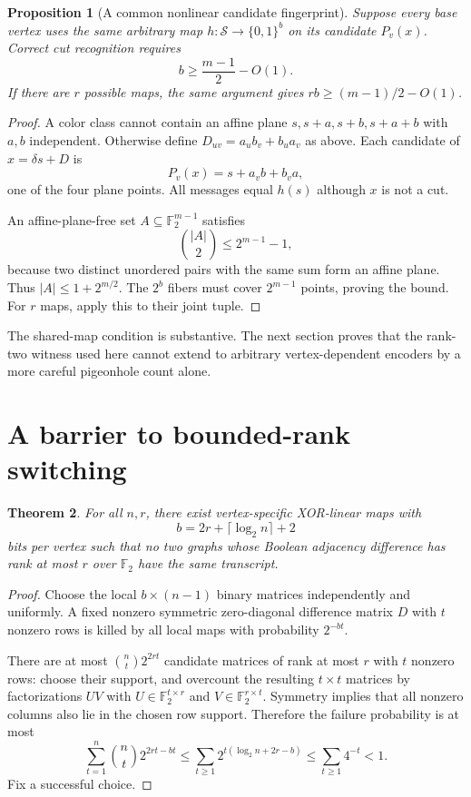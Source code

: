 \documentclass[11pt]{article}
\newtheorem{theorem}{Theorem}[section]
\newtheorem{proposition}[theorem]{Proposition}
\theoremstyle{definition}\newtheorem{definition}[theorem]{Definition}
\theoremstyle{remark}\newtheorem{remark}[theorem]{Remark}
\newcommand{\F}{\mathbb F}
\begin{document}
\begin{proposition}[A common nonlinear candidate fingerprint]\label{prop:commonnonlinear}
Suppose every base vertex uses the same arbitrary map $h:\mathcal S\to\{0,1\}^b$ on its candidate $P_v(x)$. Correct cut recognition requires
\[
 b\ge\frac{m-1}{2}-O(1).
\]
If there are $r$ possible maps, the same argument gives $rb\ge(m-1)/2-O(1)$.
\end{proposition}
\begin{proof}
A color class cannot contain an affine plane $s,s+a,s+b,s+a+b$ with $a,b$ independent. Otherwise define $D_{uv}=a_ub_v+b_ua_v$ as above. Each candidate of $x=\delta s+D$ is
\[
 P_v(x)=s+a_vb+b_va,
\]
one of the four plane points. All messages equal $h(s)$ although $x$ is not a cut.

An affine-plane-free set $A\subseteq\F_2^{m-1}$ satisfies
\[
 \binom{|A|}{2}\le2^{m-1}-1,
\]
because two distinct unordered pairs with the same sum form an affine plane. Thus $|A|\le1+2^{m/2}$. The $2^b$ fibers must cover $2^{m-1}$ points, proving the bound. For $r$ maps, apply this to their joint tuple.
\end{proof}
The shared-map condition is substantive. The next section proves that the rank-two witness used here cannot extend to arbitrary vertex-dependent encoders by a more careful pigeonhole count alone.

\section{A barrier to bounded-rank switching}
\begin{theorem}\label{thm:barrier}
For all $n,r$, there exist vertex-specific XOR-linear maps with
\[
 b=2r+\lceil\log_2n\rceil+2
\]
bits per vertex such that no two graphs whose Boolean adjacency difference has rank at most $r$ over $\F_2$ have the same transcript.
\end{theorem}
\begin{proof}
Choose the local $b\times(n-1)$ binary matrices independently and uniformly. A fixed nonzero symmetric zero-diagonal difference matrix $D$ with $t$ nonzero rows is killed by all local maps with probability $2^{-bt}$.

There are at most $\binom nt2^{2rt}$ candidate matrices of rank at most $r$ with $t$ nonzero rows: choose their support, and overcount the resulting $t\times t$ matrices by factorizations $UV$ with $U\in\F_2^{t\times r}$ and $V\in\F_2^{r\times t}$. Symmetry implies that all nonzero columns also lie in the chosen row support. Therefore the failure probability is at most
\[
 \sum_{t=1}^n\binom nt2^{2rt-bt}
 \le\sum_{t\ge1}2^{t(\log_2n+2r-b)}
 \le\sum_{t\ge1}4^{-t}<1.
\]
Fix a successful choice.
\end{proof}
\end{document}
